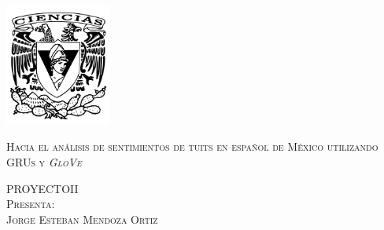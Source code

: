 \documentclass[letterpaper,12pt,oneside]{book}
\begin{document}
\begin{titlepage}
        \begin{minipage}[c][0.81\textheight][t]{0.25\textwidth}
            \vspace*{5mm}
            \begin{center}
                \hskip2.0mm
                \vrule width1pt height13cm 
                \vspace{5mm}
                \hskip2pt
                \vrule width2.5pt height13cm
                \hskip2mm
                \vrule width1pt height13cm \\
                \vspace{5mm}
                \includegraphics[height=4.0cm]{Escudo-FCIENCIAS.pdf}
            \end{center}
        \end{minipage}
        \begin{minipage}[c][0.81\textheight][t]{0.75\textwidth}
            \begin{center}
                \vspace{1cm}

                {\Large\scshape Hacia el análisis de sentimientos de tuits en español de México utilizando GRUs y \textit{GloVe}}\\[.2in]

                \vspace{2cm}            

                \textsc{\LARGE P\hspace{0.4cm}R\hspace{0.4cm}O\hspace{0.4cm}Y\hspace{0.4cm}E\hspace{0.4cm}C\hspace{0.4cm}T\hspace{0.4cm}O\hspace{0.6cm}II}\\[0.5cm]
                \textsc{\large Presenta:}\\[0.5cm]
                \textsc{\large {Jorge Esteban Mendoza Ortiz}}\\[2cm]          


\end{center}
\end{minipage}
\end{titlepage}
\end{document}
